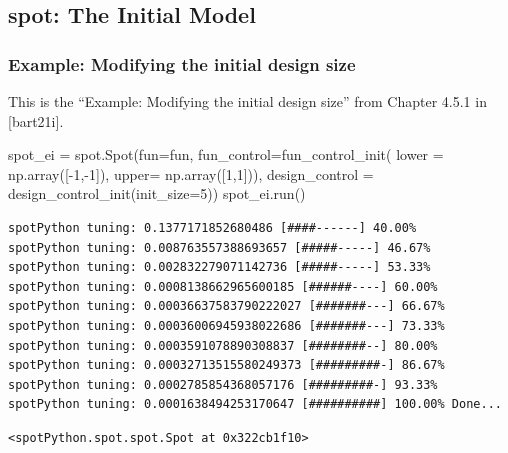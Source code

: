 \documentclass[
  letterpaper,
  DIV=11,
  numbers=noendperiod]{scrreprt}
\newenvironment{Shaded}{\begin{snugshade}}{\end{snugshade}}
\newcommand{\DecValTok}[1]{\textcolor[rgb]{0.68,0.00,0.00}{#1}}
\newcommand{\NormalTok}[1]{\textcolor[rgb]{0.00,0.23,0.31}{#1}}
\newcommand{\OperatorTok}[1]{\textcolor[rgb]{0.37,0.37,0.37}{#1}}
\begin{document}
\subsection{spot: The Initial Model}\label{spot-the-initial-model}

\subsubsection{Example: Modifying the initial design
size}\label{example-modifying-the-initial-design-size}

This is the ``Example: Modifying the initial design size'' from Chapter
4.5.1 in {[}bart21i{]}.

\begin{Shaded}
\begin{Highlighting}[]
\NormalTok{spot\_ei }\OperatorTok{=}\NormalTok{ spot.Spot(fun}\OperatorTok{=}\NormalTok{fun,}
\NormalTok{                fun\_control}\OperatorTok{=}\NormalTok{fun\_control\_init(}
\NormalTok{                lower }\OperatorTok{=}\NormalTok{ np.array([}\OperatorTok{{-}}\DecValTok{1}\NormalTok{,}\OperatorTok{{-}}\DecValTok{1}\NormalTok{]),}
\NormalTok{                upper}\OperatorTok{=}\NormalTok{ np.array([}\DecValTok{1}\NormalTok{,}\DecValTok{1}\NormalTok{])), }
\NormalTok{                design\_control }\OperatorTok{=}\NormalTok{ design\_control\_init(init\_size}\OperatorTok{=}\DecValTok{5}\NormalTok{))}
\NormalTok{spot\_ei.run()}
\end{Highlighting}
\end{Shaded}

\begin{verbatim}
spotPython tuning: 0.1377171852680486 [####------] 40.00% 
spotPython tuning: 0.008763557388693657 [#####-----] 46.67% 
spotPython tuning: 0.002832279071142736 [#####-----] 53.33% 
spotPython tuning: 0.0008138662965600185 [######----] 60.00% 
spotPython tuning: 0.00036637583790222027 [#######---] 66.67% 
spotPython tuning: 0.00036006945938022686 [#######---] 73.33% 
spotPython tuning: 0.0003591078890308837 [########--] 80.00% 
spotPython tuning: 0.00032713515580249373 [#########-] 86.67% 
spotPython tuning: 0.0002785854368057176 [#########-] 93.33% 
spotPython tuning: 0.0001638494253170647 [##########] 100.00% Done...
\end{verbatim}

\begin{verbatim}
<spotPython.spot.spot.Spot at 0x322cb1f10>
\end{verbatim}
\end{document}
